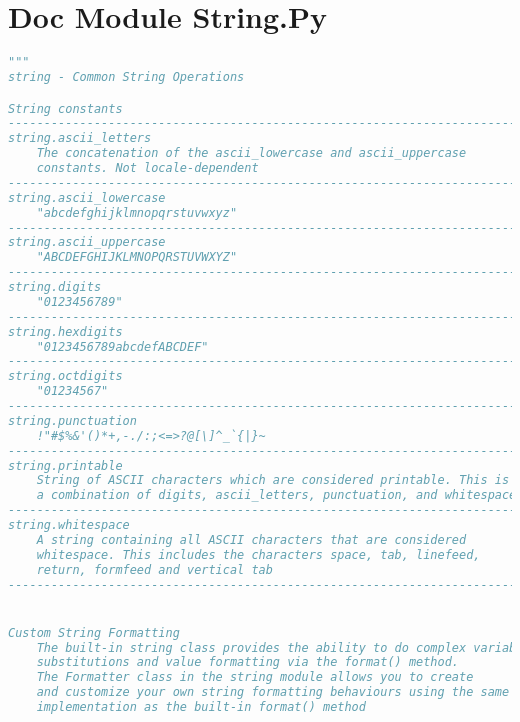 \documentclass[a4paper,landscape]{report}
\begin{document}
\section{Doc Module String.Py}
\begin{lstlisting}[language=Python]
"""
string - Common String Operations

String constants
--------------------------------------------------------------------------
string.ascii_letters
    The concatenation of the ascii_lowercase and ascii_uppercase
    constants. Not locale-dependent
--------------------------------------------------------------------------
string.ascii_lowercase
    "abcdefghijklmnopqrstuvwxyz"
--------------------------------------------------------------------------
string.ascii_uppercase
    "ABCDEFGHIJKLMNOPQRSTUVWXYZ"
--------------------------------------------------------------------------
string.digits
    "0123456789"
--------------------------------------------------------------------------
string.hexdigits
    "0123456789abcdefABCDEF"
--------------------------------------------------------------------------
string.octdigits
    "01234567"
--------------------------------------------------------------------------
string.punctuation
    !"#$%&'()*+,-./:;<=>?@[\]^_`{|}~
--------------------------------------------------------------------------
string.printable
    String of ASCII characters which are considered printable. This is
    a combination of digits, ascii_letters, punctuation, and whitespace
--------------------------------------------------------------------------
string.whitespace
    A string containing all ASCII characters that are considered
    whitespace. This includes the characters space, tab, linefeed,
    return, formfeed and vertical tab
--------------------------------------------------------------------------


Custom String Formatting
    The built-in string class provides the ability to do complex variable
    substitutions and value formatting via the format() method.
    The Formatter class in the string module allows you to create
    and customize your own string formatting behaviours using the same
    implementation as the built-in format() method


\end{lstlisting}
\end{document}

